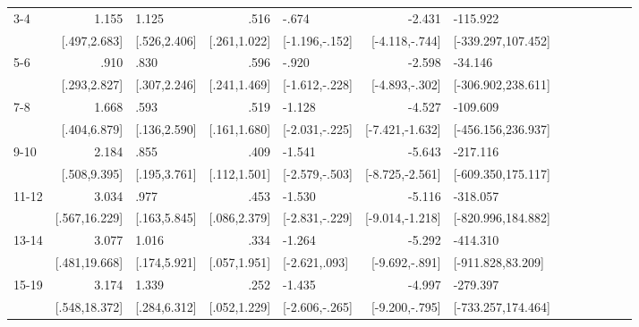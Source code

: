 \begin{table}[hp]
\begin{adjustbox}{max width=\linewidth}
\begin{threeparttable}
{\begin{tabular}{l*{6}{D{.}{.}{-1}l}}
3-4             &           1.155&           1.125&            .516&           -.674&          -2.431&        -115.922\\
                &    [.497,2.683]&    [.526,2.406]&    [.261,1.022]&  [-1.196,-.152]&  [-4.118,-.744]&[-339.297,107.452]\\

5-6             &            .910&            .830&            .596&           -.920&          -2.598&         -34.146\\
                &    [.293,2.827]&    [.307,2.246]&    [.241,1.469]&  [-1.612,-.228]&  [-4.893,-.302]&[-306.902,238.611]\\

7-8             &           1.668&            .593&            .519&          -1.128&          -4.527&        -109.609\\
                &    [.404,6.879]&    [.136,2.590]&    [.161,1.680]&  [-2.031,-.225]& [-7.421,-1.632]&[-456.156,236.937]\\

9-10            &           2.184&            .855&            .409&          -1.541&          -5.643&        -217.116\\
                &    [.508,9.395]&    [.195,3.761]&    [.112,1.501]&  [-2.579,-.503]& [-8.725,-2.561]&[-609.350,175.117]\\

11-12           &           3.034&            .977&            .453&          -1.530&          -5.116&        -318.057\\
                &   [.567,16.229]&    [.163,5.845]&    [.086,2.379]&  [-2.831,-.229]& [-9.014,-1.218]&[-820.996,184.882]\\

13-14           &           3.077&           1.016&            .334&          -1.264&          -5.292&        -414.310\\
                &   [.481,19.668]&    [.174,5.921]&    [.057,1.951]&   [-2.621,.093]&  [-9.692,-.891]&[-911.828,83.209]\\

15-19           &           3.174&           1.339&            .252&          -1.435&          -4.997&        -279.397\\
                &   [.548,18.372]&    [.284,6.312]&    [.052,1.229]&  [-2.606,-.265]&  [-9.200,-.795]&[-733.257,174.464]\\


\end{tabular}}
\end{threeparttable}
\end{adjustbox}
\end{table}

